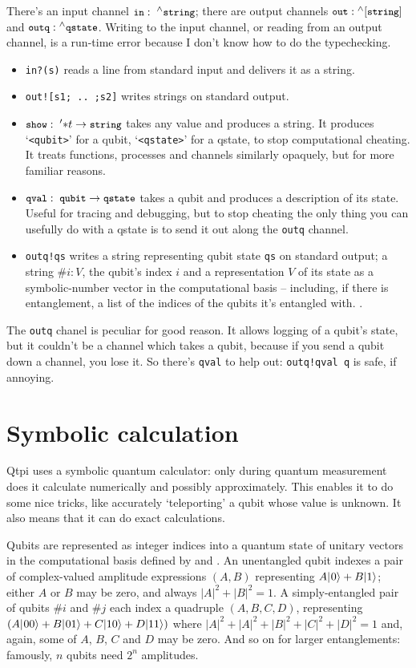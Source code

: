 \documentclass[11pt,a4paper]{book}
\newcommand{\verbtt}[1]{\texttt{\small{}#1}}
\newcommand{\caret}[0]{\ensuremath{{}^{\wedge}}}
\begin{document}
There's an input channel $\verbtt{in}:\; \caret{}\verbtt{string}$; there are output channels $\verbtt{out}: \caret{}[\verbtt{string}]$ and $\verbtt{outq}: \caret{}\verbtt{qstate}$. Writing to the input channel, or reading from an output channel, is a run-time error because I don't know how to do the typechecking.
\begin{itemize}
\item \verbtt{in?(s)} reads a line from standard input and delivers it as a string. 
\item \verbtt{out![s1; .. ;s2]} writes strings on standard output. 
\item $\verbtt{show}:\; '{*}t->\verbtt{string}$ takes any value and produces a string. It produces `\verbtt{<qubit>}' for a qubit, `\verbtt{<qstate>}' for a qstate, to stop computational cheating. It treats functions, processes and channels similarly opaquely, but for more familiar reasons.
\item $\verbtt{qval}:\; \verbtt{qubit} ->\verbtt{qstate}$ takes a qubit and produces a description of its state. Useful for tracing and debugging, but to stop cheating the only thing you can usefully do with a qstate is to send it out along the \verbtt{outq} channel.
\item \verbtt{outq!qs} writes a string representing qubit state \verbtt{qs} on standard output; a string $\#i:V$, the qubit's index $i$ and a representation $V$ of its state as a symbolic-number vector in the computational basis -- including, if there is entanglement, a list of the indices of the qubits it's entangled with.
.
\end{itemize}

The \verbtt{outq} chanel is peculiar for good reason. It allows logging of a qubit's state, but it couldn't be a channel which takes a qubit, because if you send a qubit down a channel, you lose it. So there's \verbtt{qval} to help out: \verbtt{outq!qval q} is safe, if annoying. 

\section{Symbolic calculation}

Qtpi uses a symbolic quantum calculator: only during quantum measurement does it calculate numerically and possibly approximately. This enables it to do some nice tricks, like accurately `teleporting' a qubit whose value is unknown. It also means that it can do exact calculations.

Qubits are represented as integer indices into a quantum state of unitary vectors in the computational basis defined by \zero{} and \one. An unentangled qubit indexes a pair of complex-valued amplitude expressions $(A, B)$ representing $A|\hspace{0.5pt}0\rangle+B|1\rangle\relax$; either $A$ or $B$ may be zero, and always $|A|^{2}+|B|^{2}=1$. A simply-entangled pair of qubits $\#i$ and $\#j$ each index a quadruple $(A,B,C,D)$, representing $(A|\hspace{0.5pt}00\rangle+B|\hspace{0.5pt}01\rangle+C|10\rangle+D|11\rangle)$ where $|A|^{2}+|A|^{2}+|B|^{2}+|C|^{2}+|D|^{2}=1$ and, again, some of $A$, $B$, $C$ and $D$ may be zero. And so on for larger entanglements: famously, $n$ qubits need $2^{n}$ amplitudes.
\end{document}

